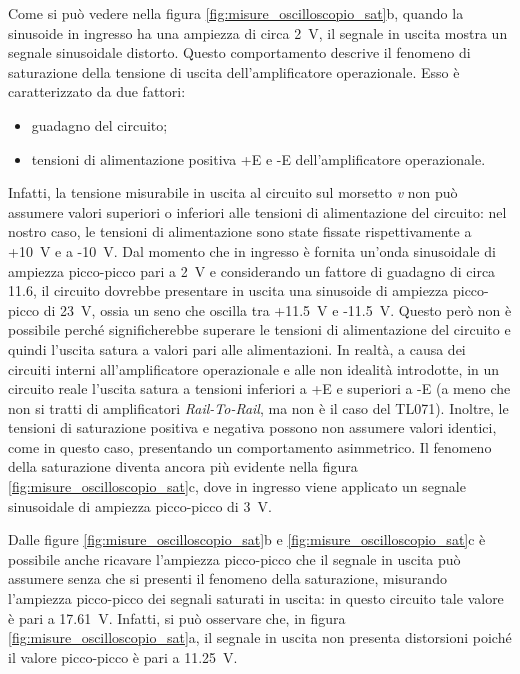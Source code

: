 \newpage
\noindent
Come si può vedere nella figura \ref{fig:misure_oscilloscopio_sat}b, quando la sinusoide in ingresso ha una ampiezza di circa \SI{2}{\volt}, il segnale in uscita mostra un segnale sinusoidale distorto. Questo comportamento descrive il fenomeno di saturazione della tensione di uscita dell'amplificatore operazionale. Esso è caratterizzato da due fattori:
\begin{itemize}
	\item guadagno del circuito;
	\item tensioni di alimentazione positiva +E e -E dell'amplificatore operazionale.
\end{itemize} 
Infatti, la tensione misurabile in uscita al circuito sul morsetto \textit{v} non può assumere valori superiori o inferiori alle tensioni di alimentazione del circuito: nel nostro caso, le tensioni di alimentazione sono state fissate rispettivamente a +\SI{10}{\volt} e a -\SI{10}{\volt}. Dal momento che in ingresso è fornita un'onda sinusoidale di ampiezza picco-picco pari a \SI{2}{\volt} e considerando un fattore di guadagno di circa 11.6, il circuito dovrebbe presentare in uscita una sinusoide di ampiezza picco-picco di \SI{23}{\volt}, ossia un seno che oscilla tra +\SI{11.5}{\volt} e -\SI{11.5}{\volt}. Questo però non è possibile perché significherebbe superare le tensioni di alimentazione del circuito e quindi l'uscita satura a valori pari alle alimentazioni. In realtà, a causa dei circuiti interni all'amplificatore operazionale e alle non idealità introdotte, in un circuito reale l'uscita satura a tensioni inferiori a +E e superiori a -E (a meno che non si tratti di amplificatori \textit{Rail-To-Rail}, ma non è il caso del TL071). Inoltre, le tensioni di saturazione positiva e negativa possono non assumere valori identici, come in questo caso, presentando un comportamento asimmetrico. Il fenomeno della saturazione diventa ancora più evidente nella figura \ref{fig:misure_oscilloscopio_sat}c, dove in ingresso viene applicato un segnale sinusoidale di ampiezza picco-picco di \SI{3}{\volt}.

\noindent
Dalle figure \ref{fig:misure_oscilloscopio_sat}b e \ref{fig:misure_oscilloscopio_sat}c  è possibile anche ricavare l'ampiezza picco-picco che il segnale in uscita può assumere senza che si presenti il fenomeno della saturazione, misurando l'ampiezza picco-picco dei segnali saturati in uscita: in questo circuito tale valore è pari a \SI{17.61}{\volt}. Infatti, si può osservare che, in figura \ref{fig:misure_oscilloscopio_sat}a, il segnale in uscita non presenta distorsioni poiché il valore picco-picco è pari a \SI{11.25}{\volt}. 

